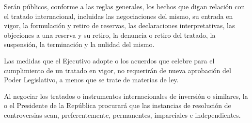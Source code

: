 \documentclass[11pt, a4paper]{article}
\begin{document}
\begin{enumerate}
Serán públicos, conforme a las reglas generales, los hechos que digan relación con el tratado internacional, incluidas las negociaciones del mismo, su entrada en vigor, la formulación y retiro de reservas, las declaraciones interpretativas, las objeciones a una reserva y su retiro, la denuncia o retiro del tratado, la suspensión, la terminación y la nulidad del mismo. 

Las medidas que el Ejecutivo adopte o los acuerdos que celebre para el cumplimiento de un tratado en vigor, no requerirán de nueva aprobación del Poder Legislativo, a menos que se trate de materias de ley. 

Al negociar los tratados o instrumentos internacionales de inversión o similares, la o el Presidente de la República procurará que las instancias de resolución de controversias sean, preferentemente, permanentes, imparciales e independientes. 


\end{enumerate}
\end{document}
